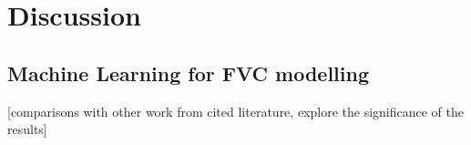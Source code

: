 \section{Discussion}\label{sec:discussion}
\subsection{Machine Learning for FVC modelling}\label{sec:fvc}

[comparisons with other work from cited literature, explore the significance of the results]